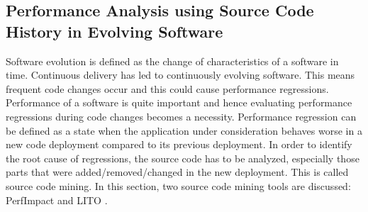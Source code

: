 \documentclass[article,type=msc,colorback,12pt,accentcolor=tud8b,table]{tudthesis}
\begin{document}
	\subsection{Performance Analysis using Source Code History in Evolving Software}
	
	 Software evolution is defined as the change of characteristics of a software in time. Continuous delivery has led to continuously evolving software. This means frequent code changes occur and this could cause performance regressions. Performance of a software is quite important and hence evaluating performance regressions during code changes becomes a necessity. Performance regression can be defined as a state when the application under consideration behaves worse in a new code deployment compared to its previous deployment. In order to identify the root cause of regressions, the source code has to be analyzed, especially those parts that were added/removed/changed in the new deployment. This is called source code mining. In this section, two source code mining tools are discussed: PerfImpact \cite{luo2016mining} and LITO \cite{sandoval2016learning}.
\end{document}
